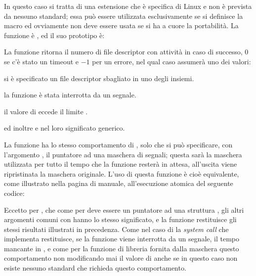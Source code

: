 In questo caso si tratta di una estensione che è specifica di Linux e non è
prevista da nessuno standard; essa può essere utilizzata esclusivamente se si
definisce la macro  ed ovviamente non deve essere usata
se si ha a cuore la portabilità. La funzione è , ed il suo
prototipo è:

\begin{funcproto}{

}

{La funzione ritorna il numero di file descriptor con attività in caso di
  successo, $0$ se c'è stato un timeout e $-1$ per un errore, nel qual caso
   assumerà uno dei valori:
  \begin{errlist}
  \item[\errcode{EBADF}] si è specificato un file descriptor sbagliato in uno
    degli insiemi.
  \item[\errcode{EINTR}] la funzione è stata interrotta da un segnale.
  \item[\errcode{EINVAL}] il valore di  eccede il limite
    .
  \end{errlist}
ed inoltre  e  nel loro significato generico.
}  
\end{funcproto}

La funzione ha lo stesso comportamento di , solo che si può
specificare, con l'argomento , il puntatore ad una maschera di
segnali; questa sarà la maschera utilizzata per tutto il tempo che la funzione
resterà in attesa, all'uscita viene ripristinata la maschera originale.  L'uso
di questa funzione è cioè equivalente, come illustrato nella pagina di
manuale, all'esecuzione atomica del seguente codice:

Eccetto per , che come per  deve essere un
puntatore ad una struttura , gli altri argomenti comuni con
 hanno lo stesso significato, e la funzione restituisce gli stessi
risultati illustrati in precedenza. Come nel caso di  la
\textit{system call} che implementa  restituisce, se la funzione
viene interrotta da un segnale, il tempo mancante in , e come
per  la funzione di libreria fornita dalla  maschera
questo comportamento non modificando mai il valore di  anche se
in questo caso non esiste nessuno standard che richieda questo comportamento.

